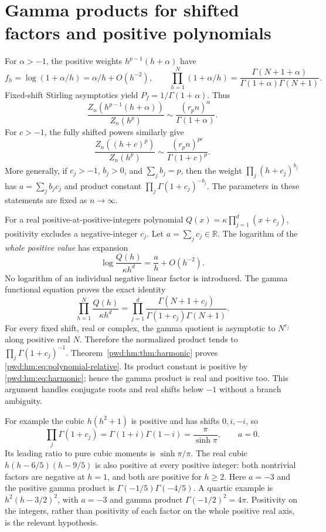 \documentclass[11pt,letterpaper]{article}
\numberwithin{equation}{section}
\theoremstyle{remark}\newtheorem{remark}[theorem]{Remark}
\begin{document}
\section{Gamma products for shifted factors and positive polynomials}\label{pwd:hm:sec:gamma}
For $\alpha>-1$, the positive weights $h^{p-1}(h+\alpha)$ have
\[
 f_h=\log(1+\alpha/h)=\alpha/h+O(h^{-2}),\qquad
 \prod_{h=1}^N(1+\alpha/h)=\frac{\Gamma(N+1+\alpha)}{\Gamma(1+\alpha)\Gamma(N+1)}.
\]
Fixed-shift Stirling asymptotics yield $P_f=1/\Gamma(1+\alpha)$. Thus
\begin{equation}\label{pwd:hm:eq:one-shift}
 \frac{Z_n(h^{p-1}(h+\alpha))}{Z_n(h^p)}
 \sim\frac{(r_pn)^\alpha}{\Gamma(1+\alpha)}.
\end{equation}
For $c>-1$, the fully shifted powers similarly give
\begin{equation}\label{pwd:hm:eq:all-shift}
 \frac{Z_n((h+c)^p)}{Z_n(h^p)}
 \sim\frac{(r_pn)^{pc}}{\Gamma(1+c)^p}.
\end{equation}
More generally, if $c_j>-1$, $b_j>0$, and $\sum_jb_j=p$, then the weight
$\prod_j(h+c_j)^{b_j}$ has $a=\sum_jb_jc_j$ and product constant
$\prod_j\Gamma(1+c_j)^{-b_j}$. The parameters in these statements are fixed as $n\to\infty$.

For a real positive-at-positive-integers polynomial
$Q(x)=\kappa\prod_{j=1}^d(x+c_j)$, positivity excludes a negative-integer $c_j$. Let $a=\sum_jc_j\in\mathbb R$. The logarithm of the \emph{whole positive value} has expansion
\[
 \log\frac{Q(h)}{\kappa h^d}=\frac ah+O(h^{-2}).
\]
No logarithm of an individual negative linear factor is introduced. The gamma functional equation proves the exact identity
\begin{equation}\label{pwd:hm:eq:finite-gamma}
 \prod_{h=1}^N\frac{Q(h)}{\kappa h^d}
 =\prod_{j=1}^d\frac{\Gamma(N+1+c_j)}{\Gamma(1+c_j)\Gamma(N+1)}.
\end{equation}
For every fixed shift, real or complex, the gamma quotient is asymptotic to $N^{c_j}$ along positive real $N$. Therefore the normalized product tends to
$\prod_j\Gamma(1+c_j)^{-1}$. Theorem~\ref{pwd:hm:thm:harmonic} proves \eqref{pwd:hm:eq:polynomial-relative}. Its product constant is positive by \eqref{pwd:hm:eq:harmonic}; hence the gamma product is real and positive too. This argument handles conjugate roots and real shifts below $-1$ without a branch ambiguity.

For example the cubic $h(h^2+1)$ is positive and has shifts $0,i,-i$, so
\[
 \prod_j\Gamma(1+c_j)=\Gamma(1+i)\Gamma(1-i)=\frac\pi{\sinh\pi},\qquad a=0.
\]
Its leading ratio to pure cubic moments is $\sinh\pi/\pi$. The real cubic
$h(h-6/5)(h-9/5)$ is also positive at every positive integer: both nontrivial factors are negative at $h=1$, and both are positive for $h\ge2$. Here $a=-3$ and the positive gamma product is $\Gamma(-1/5)\Gamma(-4/5)$. A quartic example is $h^2(h-3/2)^2$, with $a=-3$ and gamma product $\Gamma(-1/2)^2=4\pi$. Positivity on the integers, rather than positivity of each factor on the whole positive real axis, is the relevant hypothesis.
\end{document}
